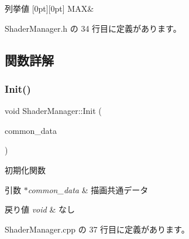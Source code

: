 \begin{DoxyEnumFields}{列挙値}
[0pt][0pt]{}\mbox{\label{class_shader_manager_a9b51e49d70eb3cc58f6d1f3994e8cfbda26a4b44a837bf97b972628509912b4a5}} 
M\+AX&\\
\hline

\end{DoxyEnumFields}


 Shader\+Manager.\+h の 34 行目に定義があります。



\subsection{関数詳解}
\mbox{\label{class_shader_manager_a482286710edced4ec663dfe4e8ff6756}} 
\subsubsection{\texorpdfstring{Init()}{Init()}}
{\footnotesize\ttfamily void Shader\+Manager\+::\+Init (\begin{DoxyParamCaption}\item[{\mbox{\hyperlink{class_draw_common_data}{Draw\+Common\+Data}} $\ast$}]{common\+\_\+data }\end{DoxyParamCaption})}



初期化関数 


\begin{DoxyParams}{引数}
{\em $\ast$common\+\_\+data} & 描画共通データ \\
\hline
\end{DoxyParams}

\begin{DoxyRetVals}{戻り値}
{\em void} & なし \\
\hline
\end{DoxyRetVals}


 Shader\+Manager.\+cpp の 37 行目に定義があります。

\mbox{\label{class_shader_manager_ada9ec9598240ca169bbcbd7231714e27}} 
